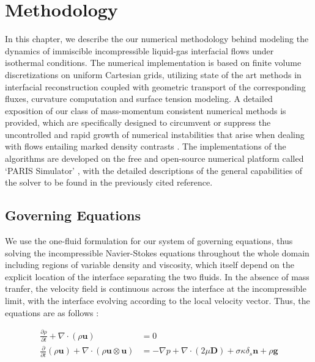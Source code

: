 \setchapterpreamble[u]{\margintoc}
\chapter{Methodology}
 
In this chapter, we describe the our numerical methodology behind modeling 
the dynamics of immiscible incompressible liquid-gas interfacial flows under isothermal conditions. 
The numerical implementation is based on finite volume discretizations on uniform Cartesian grids, 
utilizing state of the art methods in interfacial reconstruction coupled with geometric
transport of the corresponding fluxes, curvature computation and surface tension modeling. 
A detailed exposition of our class of mass-momentum consistent numerical methods is provided, 
which are specifically designed to circumvent or suppress the uncontrolled and rapid  
growth of numerical instabilities that arise when dealing with flows entailing marked density contrasts . 
The implementations of the algorithms are developed on the free and open-source 
numerical platform called `PARIS Simulator' \cite{paris}, with the detailed descriptions 
of the general capabilities of the solver to be found in the previously cited reference. 

\section{Governing Equations}

We use the one-fluid formulation for our system of governing equations, thus solving 
the incompressible Navier-Stokes equations throughout the whole domain including regions 
of variable density and viscosity, which itself depend on the explicit 
location of the interface separating the two fluids.
In the absence of mass tranfer, the velocity field is continuous across
the interface at the incompressible limit, with the interface evolving according to the local velocity vector.  
Thus, the equations are as follows :  


\begin{align} 
	\frac{\partial \rho}{\partial t} + \nabla\cdot \left(\rho\boldsymbol{u}\right) &= 0 \label{mass} \\
	\frac{\partial}{\partial t} \left(\rho\boldsymbol{u}\right) + \nabla \cdot \left(\rho\boldsymbol{u}\otimes\boldsymbol{u}\right)  &= -\nabla p + \nabla \cdot \left(2 \mu \boldsymbol{D}\right) + \sigma \kappa \delta_{s}\boldsymbol{n} + \rho \boldsymbol{g}
\label{nseqn}
\end{align}


